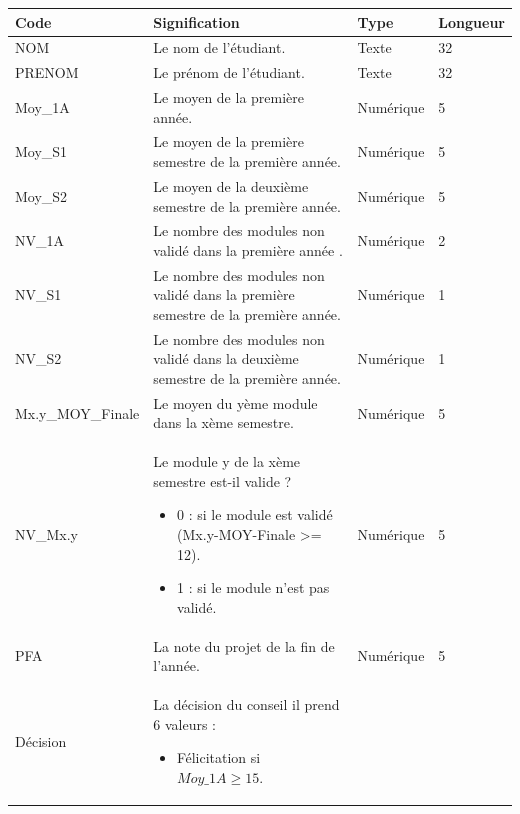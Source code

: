 \documentclass{article}
\begin{document}
                \begin{table}
                    \begin{tabular}{|p{3cm}|p{6cm}|p{2cm}|p{2cm}|}
                        \hline
                        Code & Signification & Type & Longueur \\ \hline
                        NOM & Le nom de l’étudiant. & Texte & 32 \\  \hline
                        PRENOM & Le prénom de l’étudiant. & Texte & 32 \\ \hline
                        Moy\_1A & Le moyen de la première année. & Numérique & 5 \\  \hline
                        Moy\_S1 & Le moyen de la première semestre de la première année. & Numérique & 5 \\  \hline
                        Moy\_S2 & Le moyen de la deuxième semestre de la première année. & Numérique & 5 \\  \hline
                        NV\_1A & Le nombre des modules non validé dans la première année .& Numérique & 2 \\  \hline
                        NV\_S1 & Le nombre des modules non validé dans la première semestre de la première année. & Numérique & 1 \\ \hline
                        NV\_S2 & Le nombre des modules non validé dans la deuxième semestre de la première année. & Numérique & 1 \\ \hline
                        Mx.y\_MOY\_Finale & Le moyen du yème module dans la xème semestre. & Numérique & 5 \\  \hline
                        NV_Mx.y & Le module y de la xème semestre est-il valide ?
                        \begin{itemize}
                            \item 0 : si le module est validé (Mx.y-MOY-Finale >= 12).
                            \item 1 : si le module n’est pas validé.
                        \end{itemize} & Numérique & 5 \\  \hline
                        PFA & La note du projet de la fin de l’année. & Numérique & 5 \\  \hline
                        Décision & La décision du conseil il prend 6 valeurs :
                        \begin{itemize}
                            \item Félicitation si  $Moy\_1A\ge15$.

\end{itemize}
\end{tabular}
\end{table}
\end{document}
